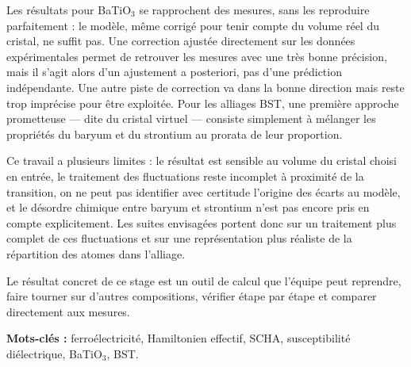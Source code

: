 \documentclass{rapportCS}
\begin{document}
Les résultats pour BaTiO$_3$ se rapprochent des mesures, sans les reproduire
parfaitement : le modèle, même corrigé pour tenir compte du volume réel du
cristal, ne suffit pas. Une correction ajustée directement sur les données
expérimentales permet de retrouver les mesures avec une très bonne précision,
mais il s'agit alors d'un ajustement a posteriori, pas d'une prédiction
indépendante. Une autre piste de correction va dans la bonne direction mais
reste trop imprécise pour être exploitée. Pour les alliages BST, une première
approche prometteuse --- dite du \og cristal virtuel\fg{} --- consiste simplement
à mélanger les propriétés du baryum et du strontium au prorata de leur
proportion.

Ce travail a plusieurs limites : le résultat est sensible au volume du cristal
choisi en entrée, le traitement des fluctuations reste incomplet à proximité de
la transition, on ne peut pas identifier avec certitude l'origine des écarts au
modèle, et le désordre chimique entre baryum et strontium n'est pas encore pris
en compte explicitement. Les suites envisagées portent donc sur un traitement
plus complet de ces fluctuations et sur une représentation plus réaliste de la
répartition des atomes dans l'alliage.

Le résultat concret de ce stage est un outil de calcul que l'équipe peut
reprendre, faire tourner sur d'autres compositions, vérifier étape par étape et
comparer directement aux mesures.

\noindent\textbf{Mots-clés :} ferroélectricité, Hamiltonien effectif, SCHA,
susceptibilité diélectrique, BaTiO$_3$, BST.

\endgroup
\clearpage
\end{document}
